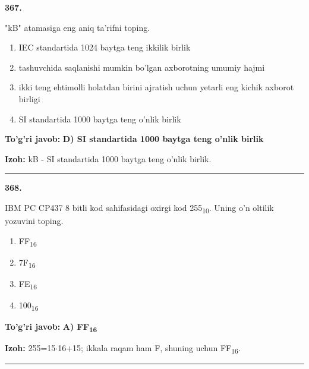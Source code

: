 \documentclass[10pt,a4paper,oneside]{article}
\begin{document}
\noindent\textbf{\color{ink}367.}
\par
"kB" atamasiga eng aniq ta'rifni toping.
\begin{enumerate}[label=\Alph*),leftmargin=9mm]
\item IEC standartida 1024 baytga teng ikkilik birlik
\item tashuvchida saqlanishi mumkin bo'lgan axborotning umumiy hajmi
\item ikki teng ehtimolli holatdan birini ajratish uchun yetarli eng kichik axborot birligi
\item SI standartida 1000 baytga teng o'nlik birlik
\end{enumerate}
\begin{tcolorbox}[enhanced,breakable,colback=teal!4,colframe=teal!50!black,boxrule=0.5pt,arc=1.1mm,left=3mm,right=3mm,top=1.7mm,bottom=1.7mm,before skip=2mm,after skip=2mm]
\textbf{\color{teal}To'g'ri javob:} \textbf{D) SI standartida 1000 baytga teng o'nlik birlik}
\par\smallskip
\textbf{Izoh:} kB - SI standartida 1000 baytga teng o'nlik birlik.
\end{tcolorbox}
\vspace{2mm}\hrule height 0.2pt \vspace{3mm}

\noindent\textbf{\color{ink}368.}
\par
IBM PC CP437 8 bitli kod sahifasidagi oxirgi kod 255\textsubscript{1}\textsubscript{0}. Uning o'n oltilik yozuvini toping.
\begin{enumerate}[label=\Alph*),leftmargin=9mm]
\item FF\textsubscript{1}\textsubscript{6}
\item 7F\textsubscript{1}\textsubscript{6}
\item FE\textsubscript{1}\textsubscript{6}
\item 100\textsubscript{1}\textsubscript{6}
\end{enumerate}
\begin{tcolorbox}[enhanced,breakable,colback=teal!4,colframe=teal!50!black,boxrule=0.5pt,arc=1.1mm,left=3mm,right=3mm,top=1.7mm,bottom=1.7mm,before skip=2mm,after skip=2mm]
\textbf{\color{teal}To'g'ri javob:} \textbf{A) FF\textsubscript{1}\textsubscript{6}}
\par\smallskip
\textbf{Izoh:} 255=15\ensuremath{\cdot}16+15; ikkala raqam ham F, shuning uchun FF\textsubscript{1}\textsubscript{6}.
\end{tcolorbox}
\vspace{2mm}\hrule height 0.2pt \vspace{3mm}
\end{document}
